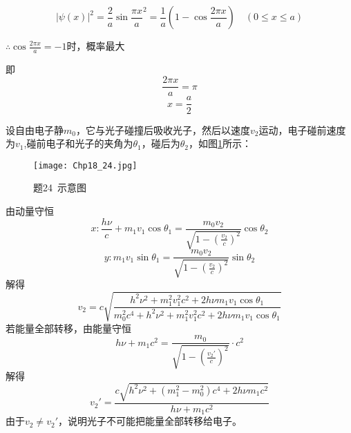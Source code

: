 \exercise

\solve 
\[ |\psi(x)|^2=\frac{2}{a}\sin{\frac{\pi x}{a}}^2=\frac{1}{a}(1-\cos{\frac{2\pi x}{a}}) \quad (0\le x \le a) \]

$\therefore \cos{\frac{2\pi x}{a}}=-1$时，概率最大

即
\[ \frac{2\pi x}{a}=\pi \]
\[ x=\frac{a}{2} \]
	
\exercise

\solve 设自由电子静$m_0$，它与光子碰撞后吸收光子，然后以速度$v_2$运动，电子碰前速度为$v_1$,碰前电子和光子的夹角为$\theta_1$，碰后为$\theta_2$，如图\ref{Chp18_24}所示：

\begin{figure}[htbp]
	\centering
	\texttt{[image: Chp18\_24.jpg]}
	\caption{题24\ 示意图}
	\label{Chp18_24}
\end{figure}
由动量守恒
\[ x:\frac{h\nu}{c}+m_1v_1\cos\theta_1=\frac{m_0v_2}{\sqrt{1-{\left(\frac{v_2}{c}\right)}^2}}\cos\theta_2 \]
\[ y:m_1v_1\sin\theta_1=\frac{m_0v_2}{\sqrt{1-{\left(\frac{v_2}{c}\right)}^2}}\sin\theta_2 \]
解得
\[ v_2=c\sqrt{\frac{h^2\nu^2+m_1^2v_1^2c^2+2h\nu m_1v_1\cos\theta_1}{m_0^2c^4+h^2\nu^2+m_1^2v_1^2c^2+2h\nu m_1v_1\cos\theta_1}} \]
若能量全部转移，由能量守恒
\[ h\nu+m_1c^2=\frac{m_0}{\sqrt{1-{\left(\frac{v_2'}{c}\right)}^2}}\cdot c^2 \]
解得
\[v_2'=\frac{c\sqrt{h^2\nu^2+(m_1^2-m_0^2)c^4+2h\nu m_1c^2}}{h\nu+m_1c^2}  \]
由于$v_2\neq v_2'$，说明光子不可能把能量全部转移给电子。